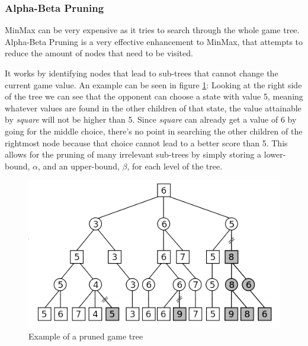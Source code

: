 \subsubsection{Alpha-Beta Pruning}

MinMax can be very expensive as it tries to search through the whole game tree. Alpha-Beta Pruning is a very effective enhancement to MinMax, that attempts to reduce the amount of nodes that need to be visited. 

It works by identifying nodes that lead to sub-trees that cannot change the current game value.
An example can be seen in figure \ref{fig:alpha_beta}: Looking at the right side of the tree we can see that the opponent can choose a state with value 5, meaning whatever values are found in the other children of that state, the value attainable by \textit{square} will not be higher than 5. Since \textit{square} can already get a value of 6 by going for the middle choice, there's no point in searching the other children of the rightmost node because that choice cannot lead to a better score than 5.
This allows for the pruning of many irrelevant sub-trees by simply storing a lower-bound, $\alpha$, and an upper-bound, $\beta$, for each level of the tree.

\begin{figure}[h]
	\centering
    \includegraphics[scale=0.8]{images/alpha_beta.png}
    \caption{Example of a pruned game tree}
    \label{fig:alpha_beta}
\end{figure}


%
%
